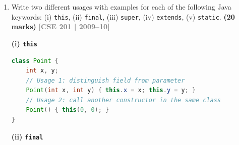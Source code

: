 \documentclass[12pt,a3paper]{article}
\newcommand{\yr}[1]{\hfill\textcolor{gray}{\small\textbf{[#1]}}}
\newcommand{\mk}[1]{\textcolor{orange!70!black}{\small\textbf{(#1 marks)}}}
\begin{document}
\begin{enumerate}
\begin{tcolorbox}[enhanced,breakable,ansbox,
  colback=cB!4,colframe=cB,boxrule=0.8pt,arc=5pt,
  title={\textbf{Answer --- Five Phases of a Java Program}},
  fonttitle=\bfseries\color{white},colbacktitle=cB]
\begin{enumerate}[label=\textbf{\arabic*.}]
  \item \textbf{Load} --- The \textbf{Class Loader} (part of the JVM)
    reads the \texttt{.class} file from disk (or network) into memory,
    ready for execution.

  \item \textbf{Verify} --- The \textbf{Bytecode Verifier} checks the
    loaded bytecode for correctness: it ensures no stack overflows,
    that operands are of the correct type, and that no illegal data
    conversions are attempted.  This step provides security.

  \item \textbf{Execute} --- The \textbf{Java Interpreter} (or
    Just-In-Time compiler) within the JVM translates bytecode into
    native machine instructions and runs the program.
\end{enumerate}

\medskip
\begin{center}
\small
\texttt{.java} $\xrightarrow{\text{javac}}$
\texttt{.class (bytecode)} $\xrightarrow{\text{ClassLoader}}$
Memory $\xrightarrow{\text{Verifier}}$
Verified $\xrightarrow{\text{JVM}}$ Execution
\end{center}


\end{tcolorbox}




\item Write two different usages with examples for each of the following Java keywords: (i) \texttt{this}, (ii) \texttt{final}, (iii) \texttt{super}, (iv) \texttt{extends}, (v) \texttt{static}. \mk{20}
\yr{CSE 201 | 2009--10}

\begin{tcolorbox}[enhanced,breakable,ansbox,
  colback=cB!4,colframe=cB,boxrule=0.8pt,arc=5pt,
  title={\textbf{Answer — Two Usages Each: this, final,
  super, extends, static}},
  fonttitle=\bfseries\color{white},colbacktitle=cB]

\textbf{(i) \texttt{this}}

\begin{lstlisting}[language=Java]
class Point {
    int x, y;
    // Usage 1: distinguish field from parameter
    Point(int x, int y) { this.x = x; this.y = y; }
    // Usage 2: call another constructor in the same class
    Point() { this(0, 0); }
}
\end{lstlisting}

\medskip
\textbf{(ii) \texttt{final}}


\end{tcolorbox}
\end{enumerate}
\end{document}
